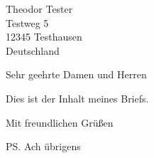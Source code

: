 \documentclass[a4paper,11pt]{dinbrief}
\begin{document}
\address{Bertram Bohne \\
		Gemüseweg 5 \\ 
		12345 Maishausen} %
\signature{Bertram Bohne} %
\subject{\bf Mein Betreff ist das Schreiben eines neuen Briefs}
\yourmail{\today} %

	\begin{letter}{\large Theodor Tester \\[\smallskipamount]
				\large Testweg 5 \\[\smallskipamount]
				\large 12345 Testhausen \\[\medskipamount]
				\large Deutschland} 
		\opening{Sehr geehrte Damen und Herren}
		
		Dies ist der Inhalt meines Briefs. \blindtext
		
		\closing{Mit freundlichen Grüßen}
		
		\ps{Ach übrigens} %
	\end{letter}
\end{document}
